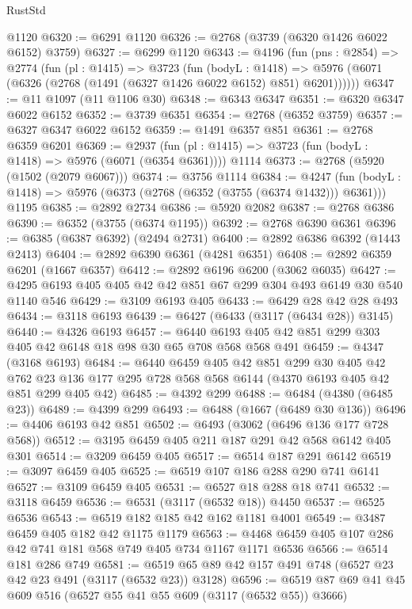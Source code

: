 \begin{lexlean}{RustStd}
\begin{coremodule}
    @1120
@6320 := @6291 @1120
@6326 := @2768 (@3739 (@6320 @1426 @6022 @6152) @3759)
@6327 := @6299 @1120
@6343 := @4196
    (fun (pns : @2854) =>
    @2774
      (fun (pl : @1415) =>
      @3723
        (fun (bodyL : @1418) =>
        @5976 (@6071 (@6326 (@2768 (@1491 (@6327 @1426 @6022 @6152) @851) @6201))))))
@6347 := @11 @1097 (@11 @1106 @30)
@6348 := @6343 @6347
@6351 := @6320 @6347 @6022 @6152
@6352 := @3739 @6351
@6354 := @2768 (@6352 @3759)
@6357 := @6327 @6347 @6022 @6152
@6359 := @1491 @6357 @851
@6361 := @2768 @6359 @6201
@6369 := @2937
    (fun (pl : @1415) => @3723 (fun (bodyL : @1418) => @5976 (@6071 (@6354 @6361))))
    @1114
@6373 := @2768 (@5920 (@1502 (@2079 @6067)))
@6374 := @3756 @1114
@6384 := @4247
    (fun (bodyL : @1418) => @5976 (@6373 (@2768 (@6352 (@3755 (@6374 @1432))) @6361)))
    @1195
@6385 := @2892 @2734
@6386 := @5920 @2082
@6387 := @2768 @6386
@6390 := @6352 (@3755 (@6374 @1195))
@6392 := @2768 @6390 @6361
@6396 := @6385 (@6387 @6392) (@2494 @2731)
@6400 := @2892 @6386 @6392 (@1443 @2413)
@6404 := @2892 @6390 @6361 (@4281 @6351)
@6408 := @2892 @6359 @6201 (@1667 @6357)
@6412 := @2892 @6196 @6200 (@3062 @6035)
@6427 := @4295 @6193 @405 @405 @42 @42 @851 @67 @299 @304 @493 @6149 @30 @540 @1140 @546
@6429 := @3109 @6193 @405
@6433 := @6429 @28 @42 @28 @493
@6434 := @3118 @6193
@6439 := @6427 (@6433 (@3117 (@6434 @28)) @3145)
@6440 := @4326 @6193
@6457 := @6440 @6193 @405 @42 @851 @299 @303 @405 @42 @6148 @18 @98 @30 @65 @708 @568 @568 @491
@6459 := @4347 (@3168 @6193)
@6484 := @6440
    @6459
    @405
    @42
    @851
    @299
    @30
    @405
    @42
    @762
    @23
    @136
    @177
    @295
    @728
    @568
    @568
    @6144
    (@4370 @6193 @405 @42 @851 @299 @405 @42)
@6485 := @4392 @299
@6488 := @6484 (@4380 (@6485 @23))
@6489 := @4399 @299
@6493 := @6488 (@1667 (@6489 @30 @136))
@6496 := @4406 @6193 @42 @851
@6502 := @6493 (@3062 (@6496 @136 @177 @728 @568))
@6512 := @3195 @6459 @405 @211 @187 @291 @42 @568 @6142 @405 @301
@6514 := @3209 @6459 @405
@6517 := @6514 @187 @291 @6142
@6519 := @3097 @6459 @405
@6525 := @6519 @107 @186 @288 @290 @741 @6141
@6527 := @3109 @6459 @405
@6531 := @6527 @18 @288 @18 @741
@6532 := @3118 @6459
@6536 := @6531 (@3117 (@6532 @18)) @4450
@6537 := @6525 @6536
@6543 := @6519 @182 @185 @42 @162 @1181 @4001
@6549 := @3487 @6459 @405 @182 @42 @1175 @1179
@6563 := @4468 @6459 @405 @107 @286 @42 @741 @181 @568 @749 @405 @734 @1167 @1171 @6536
@6566 := @6514 @181 @286 @749
@6581 := @6519 @65 @89 @42 @157 @491 @748 (@6527 @23 @42 @23 @491 (@3117 (@6532 @23)) @3128)
@6596 := @6519 @87 @69 @41 @45 @609 @516 (@6527 @55 @41 @55 @609 (@3117 (@6532 @55)) @3666)

\end{coremodule}
\end{lexlean}

